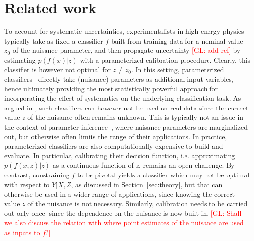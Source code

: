 \documentclass[twocolumn,superscriptaddress,aps]{revtex4-1}
\newcommand{\glnote}[1]{\textcolor{red}{[GL: #1]}}
\theoremstyle{plain}
\begin{document}

\section{Related work}

To account for systematic uncertainties, experimentalists in high energy physics
typically take as fixed a classifier $f$ built from training data for a nominal
value $z_0$ of the nuisance parameter, and then propagate uncertainty
\glnote{add ref} by estimating $p(f(x)|z)$ with a parameterized calibration
procedure. Clearly, this classifier is however not optimal for $z \neq z_0$. In
this setting, parameterized
classifiers~\citep{cranmer2015approximating,Baldi:2016fzo} directly take
(nuisance) parameters as additional input variables, hence ultimately providing
the most statistically powerful approach for incorporating the effect of
systematics on the underlying classification task.  As argued in
\citep{Neal:2007zz}, such classifiers can however not be used on real data since
the correct value $z$ of the nuisance often remains unknown. This is typically
not an issue in the context of parameter
inference~\citep{cranmer2015approximating}, where nuisance parameters are
marginalized out, but otherwise often limits the range of their applications. In
practice, parameterized classifiers  are also computationally expensive to build
and evaluate. In particular, calibrating their decision function, i.e.
approximating $p(f(x,z)|z)$ as a continuous function of $z$, remains an open
challenge. By contrast, constraining $f$ to be pivotal yields a classifier which
may not be optimal with respect to $Y|X,Z$, as discussed in
Section~\ref{sec:theory}, but that can otherwise be used in a wider range of
applications, since knowing the correct value $z$ of the nuisance is not
necessary. Similarly, calibration needs to be carried out only once, since  the
dependence on the nuisance is now built-in. \glnote{Shall we also discuss the
relation with \citep{Neal:2007zz} where point estimates of the nuisance are used
as inputs to $f$?}
\end{document}
